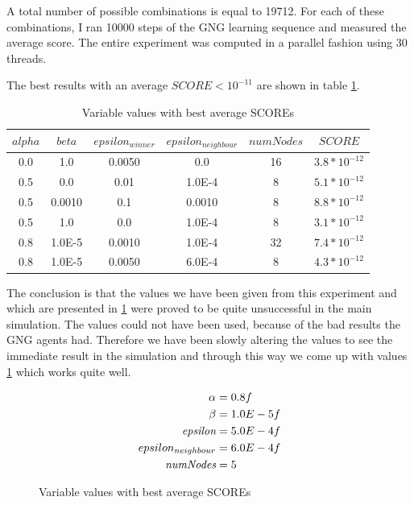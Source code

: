 A total number of possible combinations is equal to 19712. For each of these combinations, I ran 10000 steps of the GNG learning sequence and measured the average score. The entire experiment was computed in a parallel fashion using 30 threads.

The best results with an average $SCORE < 10^{-11}$ are shown in table \ref{usedalgo:gngexperimentresults}.

\begin{table}
\begin{center}
\begin{tabular}{ccccc|c}

$alpha$ & $beta$ & $epsilon_{winner}$ & $epsilon_{neighbour}$ & $numNodes$ & $SCORE$ \\
\hline
0.0 & 1.0 & 0.0050 & 0.0 & 16 & $3.8*10^{-12}$ \\
0.5 & 0.0 & 0.01 & 1.0E-4 & 8 & $5.1*10^{-12}$ \\   
0.5 & 0.0010 & 0.1 & 0.0010 & 8 & $8.8*10^{-12}$ \\ 
0.5 & 1.0 & 0.0 & 1.0E-4 & 8 & $3.1*10^{-12}$ \\     
0.8 & 1.0E-5 & 0.0010 & 1.0E-4 & 32 & $7.4*10^{-12}$ \\
0.8 & 1.0E-5 & 0.0050 & 6.0E-4 & 8 & $4.3*10^{-12}$ \\

\end{tabular}      
\label{usedalgo:gngexperimentresults}
\caption{Variable values with best average SCOREs}
\end{center}
\end{table}

The conclusion is that the values we have been given from this experiment and which are presented in \ref{usedalgo:gngexperimentresults} were proved to be quite unsuccessful in the main simulation. The values could not have been used, because of the bad results the GNG agents had. Therefore we have been slowly altering the values to see the immediate result in the simulation and through this way we come up with values \ref{usedalgo:finalsettingforexperiments} which works quite well.

\begin{figure}
	\begin{align*} \alpha &= 0.8f \\ 
	\beta &= 1.0E-5f \\ 
	\emph{epsilon} &= 5.0E-4f \\
	\emph{$epsilon_{neighbour}$} &= 6.0E-4f \\
	\emph{numNodes} &= 5
	\end{align*}
	\caption{Variable values with best average SCOREs}
	\label{usedalgo:finalsettingforexperiments}
\end{figure}

